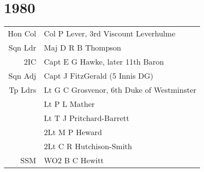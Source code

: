 \chapter*{1980}

\begin{center}
  \small
  \begin{tabular}{rl}
    Hon Col & Col P Lever, 3rd Viscount Leverhulme \\
    Sqn Ldr & Maj D R B Thompson \\
    2IC & Capt E G Hawke, later 11th Baron \\
    Sqn Adj & Capt J FitzGerald (5 Innis DG) \\
    Tp Ldrs & Lt G C Grosvenor, 6th Duke of Westminster \\
      & Lt P L Mather \\
      & Lt T J Pritchard-Barrett \\
      & 2Lt M P Heward \\
      & 2Lt C R Hutchison-Smith \\
    SSM & WO2 B C Hewitt \\
  \end{tabular}
\end{center}

